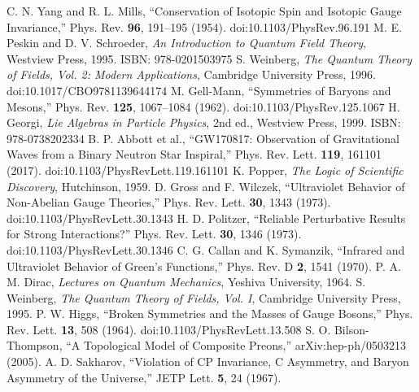 \documentclass[10pt,reprint,aps,onecolumn,nofootinbib]{revtex4-2}
\begin{document}
\begin{thebibliography}{99}
     C. N. Yang and R. L. Mills, ``Conservation of Isotopic Spin and Isotopic Gauge Invariance,'' Phys. Rev. \textbf{96}, 191--195 (1954). doi:10.1103/PhysRev.96.191
     M. E. Peskin and D. V. Schroeder, \emph{An Introduction to Quantum Field Theory}, Westview Press, 1995. ISBN: 978-0201503975
     S. Weinberg, \emph{The Quantum Theory of Fields, Vol. 2: Modern Applications}, Cambridge University Press, 1996. doi:10.1017/CBO9781139644174
     M. Gell-Mann, ``Symmetries of Baryons and Mesons,'' Phys. Rev. \textbf{125}, 1067--1084 (1962). doi:10.1103/PhysRev.125.1067
     H. Georgi, \emph{Lie Algebras in Particle Physics}, 2nd ed., Westview Press, 1999. ISBN: 978-0738202334
     B. P. Abbott et al., ``GW170817: Observation of Gravitational Waves from a Binary Neutron Star Inspiral,'' Phys. Rev. Lett. \textbf{119}, 161101 (2017). doi:10.1103/PhysRevLett.119.161101
     K. Popper, \emph{The Logic of Scientific Discovery}, Hutchinson, 1959.
     D. Gross and F. Wilczek, ``Ultraviolet Behavior of Non-Abelian Gauge Theories,'' Phys. Rev. Lett. \textbf{30}, 1343 (1973). doi:10.1103/PhysRevLett.30.1343
     H. D. Politzer, ``Reliable Perturbative Results for Strong Interactions?'' Phys. Rev. Lett. \textbf{30}, 1346 (1973). doi:10.1103/PhysRevLett.30.1346
     C. G. Callan and K. Symanzik, ``Infrared and Ultraviolet Behavior of Green's Functions,'' Phys. Rev. D \textbf{2}, 1541 (1970).
     P. A. M. Dirac, \emph{Lectures on Quantum Mechanics}, Yeshiva University, 1964.
     S. Weinberg, \emph{The Quantum Theory of Fields, Vol. I}, Cambridge University Press, 1995.
     P. W. Higgs, ``Broken Symmetries and the Masses of Gauge Bosons,'' Phys. Rev. Lett. \textbf{13}, 508 (1964). doi:10.1103/PhysRevLett.13.508
     S. O. Bilson-Thompson, ``A Topological Model of Composite Preons,'' arXiv:hep-ph/0503213 (2005).
     A. D. Sakharov, ``Violation of CP Invariance, C Asymmetry, and Baryon Asymmetry of the Universe,'' JETP Lett. \textbf{5}, 24 (1967).
    \end{thebibliography}

\newpage
\appendix
\end{document}
